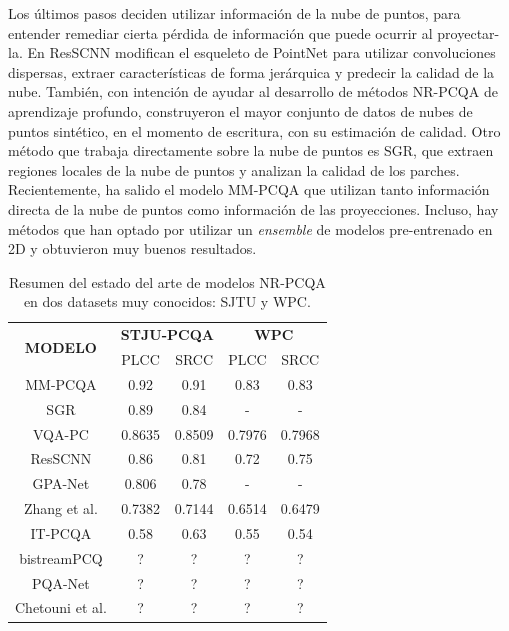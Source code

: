 Los últimos pasos deciden utilizar información de la nube de puntos, para 
entender remediar cierta pérdida de información que puede ocurrir al proyectar-la. 
En ResSCNN\cite{ResSCNN} modifican el esqueleto de PointNet\cite{PointNet} para 
utilizar convoluciones dispersas, extraer características de forma jerárquica y 
predecir la calidad de la nube. También, con intención de ayudar al desarrollo 
de métodos NR-PCQA de aprendizaje profundo, construyeron el mayor conjunto de datos
de nubes de puntos sintético, en el momento de escritura, con su estimación de calidad. 
Otro método que trabaja directamente sobre la nube de puntos es SGR\cite{SGR}, 
que extraen regiones locales de la nube de puntos y analizan la calidad de los parches.
Recientemente, ha salido el modelo MM-PCQA\cite{MM-PCQA} que utilizan tanto información 
directa de la nube de puntos como información de las proyecciones. Incluso, hay 
métodos que han optado por utilizar un \emph{ensemble}\cite{EnsemblePCQA} de 
modelos pre-entrenado en 2D y obtuvieron muy buenos resultados. 

\begin{table}[H]
    \centering
    \small
    \begin{tabular}{|c|c|c|c|c|}
        \hline
        \multirow{2}{*}{\textbf{MODELO}} & \multicolumn{2}{c|}{\textbf{STJU-PCQA}} & \multicolumn{2}{c|}{\textbf{WPC}} \\
        \cline{2-5}
                        & PLCC & SRCC & PLCC & SRCC\\
        \hline
        MM-PCQA\cite{MM-PCQA} & 0.92 & 0.91 & 0.83 & 0.83\\
        \hline
        SGR\cite{SGR} & 0.89 & 0.84 & - & - \\
        \hline
        VQA-PC\cite{VQA-PC} & 0.8635 & 0.8509 & 0.7976 & 0.7968\\
        \hline
        ResSCNN\cite{ResSCNN} & 0.86 & 0.81 & 0.72 & 0.75\\
        \hline
        GPA-Net\cite{GPA-NET} & 0.806 & 0.78 & - & - \\
        \hline
        Zhang et al.\cite{NR3DQA}& 0.7382 & 0.7144 & 0.6514 & 0.6479\\
        \hline
        IT-PCQA \cite{IT-PCQA}& 0.58 & 0.63 & 0.55  & 0.54\\
        \hline
        bistreamPCQ\cite{bitstreamPCQ} & ? & ? & ? & ?\\
        \hline
        PQA-Net\cite{PQA-Net} & ? & ? & ? & ?\\
        \hline 
        Chetouni et al.\cite{NR-CNN-3D-PC}& ? & ? & ? & ? \\
        \hline
    \end{tabular}
    \caption[Estado del arte de modelos NR-PCQA]{Resumen del estado del arte de modelos NR-PCQA en dos datasets muy conocidos: SJTU\cite{SJTU} y WPC\cite{WPC1,WPC2}.}
\end{table}

